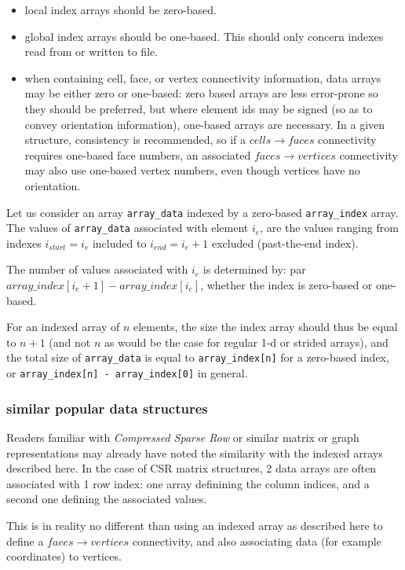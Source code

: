 \begin{itemize}
\item local index arrays should be zero-based.
\item global index arrays should be one-based. This should only concern
      indexes read from or written to file.
\item when containing cell, face, or vertex connectivity information, data
      arrays may be either zero or one-based: zero based arrays are less
      error-prone so they should be preferred, but where element ids may be
      signed (so as to convey orientation information), one-based arrays are
      necessary. In a given structure, consistency is recommended, so if
      a $cells \rightarrow faces$ connectivity requires one-based face numbers,
      an associated $faces \rightarrow vertices$ connectivity may also use
      one-based vertex numbers, even though vertices have no orientation.
\end{itemize}

Let us consider an array \texttt{array\_data} indexed by a zero-based
\texttt{array\_index} array. The values of \texttt{array\_data} associated with
element $i_e$, are the values ranging from indexes $i_{start}=i_e$
included to $i_{end}=i_e+1$ excluded (past-the-end index).

The number of values associated with $i_e$ is determined by:
par $array\_index[i_e+1] - array\_index[i_e]$, whether the index
is zero-based or one-based.

For an indexed array of $n$ elements, the size the index array should thus
be equal to $n+1$ (and not $n$ as would be the case for regular 1-d or
strided arrays), and the total size of \texttt{array\_data} is equal to
\texttt{array\_index[n]} for a zero-based index, or
\texttt{array\_index[n] - array\_index[0]} in general.

\subsubsection{similar popular data structures}

Readers familiar with \emph{Compressed Sparse Row} or similar matrix or
graph representations may already have noted the similarity with
the indexed arrays described here. In the case of CSR matrix structures,
2 data arrays are often associated with 1 row index: one array definining
the column indices, and a second one defining the associated values.

This is in reality no different than using an indexed array as described here
to define a $faces \rightarrow vertices$ connectivity, and also associating
data (for example coordinates) to vertices.

